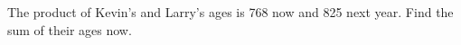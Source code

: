 The product of Kevin's and Larry's ages is 768 now and 825 next year. Find the sum of their ages now.
